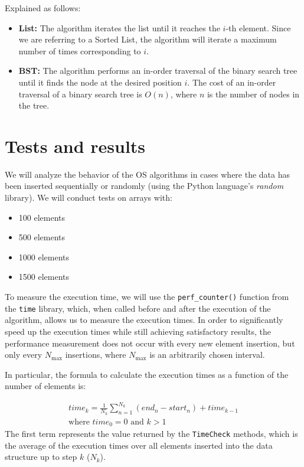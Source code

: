 \documentclass[11pt]{article}
\begin{document}
Explained as follows:
\begin{itemize}
    \item \textbf{List:} The algorithm iterates the list until it reaches the $i$-th element. Since we are referring to a Sorted List, the algorithm will iterate a maximum number of times corresponding to $i$. 
    \item \textbf{BST:} The algorithm performs an in-order traversal of the binary search tree until it finds the node at the desired position $i$. The cost of an in-order traversal of a binary search tree is $O(n)$, where $n$ is the number of nodes in the tree.
\end{itemize}
\section{Tests and results}
We will analyze the behavior of the OS algorithms in cases where the data has been inserted sequentially or randomly (using the Python language's \textit{random} library). We will conduct tests on arrays with:
\begin{itemize}
    \item 100 elements
    \item 500 elements
    \item 1000 elements
    \item 1500 elements
\end{itemize}

To measure the execution time, we will use the \texttt{perf\_counter()} function from the \texttt{time} library, which, when called before and after the execution of the algorithm, allows us to measure the execution times. In order to significantly speed up the execution times while still achieving satisfactory results, the performance measurement does not occur with every new element insertion, but only every $N_{\text{max}}$ insertions, where $N_{\text{max}}$ is an arbitrarily chosen interval.

In particular, the formula to calculate the execution times as a function of the number of elements is:

\begin{gather*}
\text{$time$}_k = \frac{1}{N_k} \sum_{n=1}^{N_k} (end_n - start_n) + \text{$time$}_{k-1} \\
\text{where } \text{$time$}_0 = 0 \text{ and } k > 1
\end{gather*}
The first term represents the value returned by the \texttt{TimeCheck} methods, which is the average of the execution times over all elements inserted into the data structure up to step $k$ ($N_k$).
\end{document}
